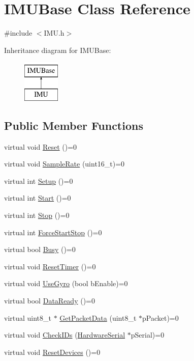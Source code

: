 \hypertarget{class_i_m_u_base}{
\section{IMUBase Class Reference}
\label{class_i_m_u_base}
}


{\ttfamily \#include $<$IMU.h$>$}

Inheritance diagram for IMUBase:\begin{figure}[H]
\begin{center}
\leavevmode
\includegraphics[height=2.000000cm]{class_i_m_u_base}
\end{center}
\end{figure}
\subsection*{Public Member Functions}
\begin{DoxyCompactItemize}
\item 
virtual void \hyperlink{class_i_m_u_base_a27fdd96992dfa8867943407fc400d071}{Reset} ()=0
\item 
virtual void \hyperlink{class_i_m_u_base_ad4f6b6562edc0e2b76591d0deca191d7}{SampleRate} (uint16\_\-t)=0
\item 
virtual int \hyperlink{class_i_m_u_base_a74d84beba0da335f49aa7ce94612cf13}{Setup} ()=0
\item 
virtual int \hyperlink{class_i_m_u_base_af31c2ed51cd36cc3230ebbb58757784a}{Start} ()=0
\item 
virtual int \hyperlink{class_i_m_u_base_a5b136166ec3849cbc1f93a13367eb08d}{Stop} ()=0
\item 
virtual int \hyperlink{class_i_m_u_base_a60bf7f5f9728d11bae5ca64bc7a9c10b}{ForceStartStop} ()=0
\item 
virtual bool \hyperlink{class_i_m_u_base_adb8539af8660d291fdde1f38b3d644f3}{Busy} ()=0
\item 
virtual void \hyperlink{class_i_m_u_base_a6e65b709e0212f95299ce9fa464b4651}{ResetTimer} ()=0
\item 
virtual void \hyperlink{class_i_m_u_base_a9b4cc325e9858a8bb204733dc7906ec2}{UseGyro} (bool bEnable)=0
\item 
virtual bool \hyperlink{class_i_m_u_base_a53d56fa29c66935306e1dcca140aa9ff}{DataReady} ()=0
\item 
virtual uint8\_\-t $\ast$ \hyperlink{class_i_m_u_base_a13cf0868e2c3c31838fe889315ccfb0c}{GetPacketData} (uint8\_\-t $\ast$pPacket)=0
\item 
virtual void \hyperlink{class_i_m_u_base_ab920218bb6630f9e91ef7d0f07599203}{CheckIDs} (\hyperlink{class_hardware_serial}{HardwareSerial} $\ast$pSerial)=0
\item 
virtual void \hyperlink{class_i_m_u_base_a78622fbfb40a5bbee5e83bb8a0780d04}{ResetDevices} ()=0
\end{DoxyCompactItemize}


